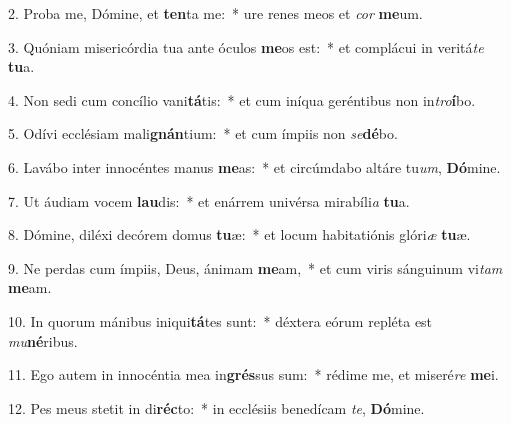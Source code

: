 2. Proba me, Dómine, et \textbf{ten}ta me:~*  ure renes meos et \textit{cor} \textbf{me}um.\

3. Quóniam misericórdia tua ante óculos \textbf{me}os est:~*  et complácui in veritá\textit{te} \textbf{tu}a.\

4. Non sedi cum concílio vani\textbf{tá}tis:~*  et cum iníqua geréntibus non in\textit{tro}\textbf{í}bo.\

5. Odívi ecclésiam mali\textbf{gnán}tium:~*  et cum ímpiis non \textit{se}\textbf{dé}bo.\

6. Lavábo inter innocéntes manus \textbf{me}as:~*  et circúmdabo altáre tu\textit{um}, \textbf{Dó}mine.\

7. Ut áudiam vocem \textbf{lau}dis:~*  et enárrem univérsa mirabíli\textit{a} \textbf{tu}a.\

8. Dómine, diléxi decórem domus \textbf{tu}æ:~*  et locum habitatiónis glóri\textit{æ} \textbf{tu}æ.\

9. Ne perdas cum ímpiis, Deus, ánimam \textbf{me}am,~*  et cum viris sánguinum vi\textit{tam} \textbf{me}am.\

10. In quorum mánibus iniqui\textbf{tá}tes sunt:~*  déxtera eórum repléta est \textit{mu}\textbf{né}ribus.\

11. Ego autem in innocéntia mea in\textbf{grés}sus sum:~*  rédime me, et miseré\textit{re} \textbf{me}i.\

12. Pes meus stetit in di\textbf{réc}to:~*  in ecclésiis benedícam \textit{te}, \textbf{Dó}mine.\

